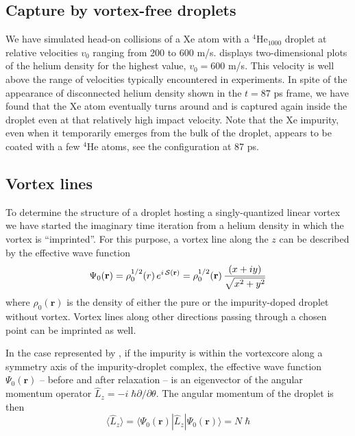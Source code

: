 		\subsection*{Capture by vortex-free droplets}
			We have simulated head-on collisions of a Xe atom with a $^4$He$_{1000}$ droplet at relative velocities $v_0$ ranging from 200 to 600 m/s.  displays two-dimensional plots of the helium density for the highest value, $v_0= 600$ m/s. This velocity is well above the range of velocities typically encountered in experiments\citep{Gom11,Gom14,Jones2016}. In spite of the appearance of disconnected helium density shown in the $t=87$ ps frame, we have found that the Xe atom eventually turns around and is captured again inside the droplet even at that relatively high impact velocity. Note that the Xe impurity, even when it temporarily emerges from the bulk of the droplet, appears to be coated with a few $^4$He atoms, see the configuration at 87 ps.

		\subsection*{Vortex lines}
			To determine the structure of a droplet hosting a singly-quantized linear vortex we have started the imaginary time iteration from a helium density in which the vortex is ``imprinted''. For this purpose, a vortex line along the $z$ can be described by the effective wave function 
			\begin{equation}
				\Psi_0(\mathbf{r}) = \rho_0^{1/2}(r) \, e^{i \, {\cal S}(\mathbf{r})} = \rho_0^{1/2}(\mathbf{r}) \, \frac{(x + i y)}{\sqrt{x^2 + y^2}} \label{eq11}
			\end{equation}
			where $\rho_0(\mathbf{r})$ is the density of either the pure or the impurity-doped droplet without vortex. Vortex lines along other directions passing through a chosen point can be imprinted as well\citep{Pi07}.
			 
			In the case represented by , if the impurity is within the vortexcore along a symmetry axis of the impurity-droplet complex,
			the effective wave function $\Psi_0({\mathbf r})$ -- before and after relaxation -- is an eigenvector of the angular 
			momentum operator $\hat{L}_z = -i \; \hbar \partial/\partial \theta$. 
			The angular momentum of the droplet is then
			\begin{equation}
				\langle \hat{L}_z \rangle = \langle \Psi_0(\mathbf{r}) | \hat{L}_z | \Psi_0(\mathbf{r}) \rangle = N \; \hbar
				\label{eq12}
			\end{equation}

